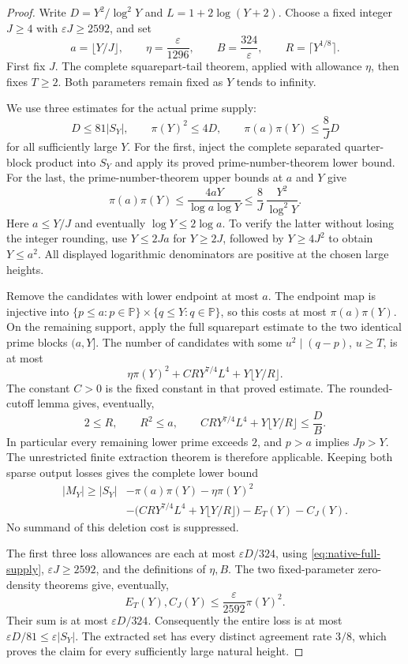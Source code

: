 \documentclass[11pt]{article}
\begin{document}
\begin{proof}
Write \(D=Y^2/\log^2Y\) and \(L=1+2\log(Y+2)\).
Choose a fixed integer \(J\ge4\) with
\(\varepsilon J\ge2592\), and set
\[
 a=\lfloor Y/J\rfloor,\qquad
 \eta=\frac{\varepsilon}{1296},\qquad
 B=\frac{324}{\varepsilon},\qquad
 R=\lceil Y^{1/8}\rceil .
\]
First fix \(J\). The complete squarepart-tail theorem, applied with
allowance \(\eta\), then fixes \(T\ge2\). Both parameters remain fixed
as \(Y\) tends to infinity.

We use three estimates for the actual prime supply:
\begin{equation}\label{eq:native-full-supply}
 D\le81|S_Y|,\qquad
 \pi(Y)^2\le4D,\qquad
 \pi(a)\pi(Y)\le\frac8J D
\end{equation}
for all sufficiently large \(Y\).
For the first, inject the complete separated quarter-block product
into \(S_Y\) and apply its proved prime-number-theorem lower bound.
For the last, the prime-number-theorem upper bounds at \(a\) and \(Y\)
give
\[
 \pi(a)\pi(Y)\le
 \frac{4aY}{\log a\log Y}
 \le\frac8J\,\frac{Y^2}{\log^2Y}.
\]
Here \(a\le Y/J\) and eventually \(\log Y\le2\log a\).
To verify the latter without losing the integer rounding, use
\(Y\le2Ja\) for \(Y\ge2J\), followed by \(Y\ge4J^2\) to obtain
\(Y\le a^2\). All displayed logarithmic denominators are positive
at the chosen large heights.

Remove the candidates with lower endpoint at most \(a\). The endpoint
map is injective into
\(\{p\le a:p\in\mathbb P\}\times\{q\le Y:q\in\mathbb P\}\),
so this costs at most \(\pi(a)\pi(Y)\).
On the remaining support, apply the full squarepart estimate to the
two identical prime blocks \((a,Y]\). The number of candidates with
some \(u^2\mid(q-p)\), \(u\ge T\), is at most
\[
 \eta\pi(Y)^2+
 CRY^{7/4}L^4+Y\lfloor Y/R\rfloor .
\]
The constant \(C>0\) is the fixed constant in that proved estimate.
The rounded-cutoff lemma gives, eventually,
\[
 2\le R,\qquad R^2\le a,\qquad
 CRY^{7/4}L^4+Y\lfloor Y/R\rfloor
 \le \frac{D}{B}.
\]
In particular every remaining lower prime exceeds \(2\), and
\(p>a\) implies \(Jp>Y\).
The unrestricted finite extraction theorem is therefore applicable.
Keeping both sparse output losses gives the complete lower bound
\begin{align*}
 |M_Y|\ge |S_Y|
 &-\pi(a)\pi(Y)-\eta\pi(Y)^2\\
 &-\bigl(CRY^{7/4}L^4+Y\lfloor Y/R\rfloor\bigr)
   -E_T(Y)-C_J(Y).
\end{align*}
No summand of this deletion cost is suppressed.

The first three loss allowances are each at most
\(\varepsilon D/324\), using \eqref{eq:native-full-supply},
\(\varepsilon J\ge2592\), and the definitions of \(\eta,B\).
The two fixed-parameter zero-density theorems give, eventually,
\[
 E_T(Y),C_J(Y)\le\frac{\varepsilon}{2592}\pi(Y)^2.
\]
Their sum is at most \(\varepsilon D/324\).
Consequently the entire loss is at most
\(\varepsilon D/81\le\varepsilon|S_Y|\).
The extracted set has every distinct agreement rate \(3/8\), which
proves the claim for every sufficiently large natural height.
\end{proof}
\end{document}
